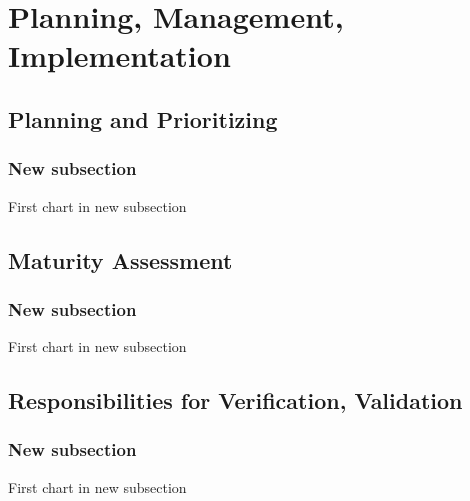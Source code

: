 % 

\section{Planning, Management, Implementation}

\subsection{Planning and Prioritizing}
\begin{frame}\frametitle{New subsection}
	First chart in new subsection
\end{frame}

\subsection{Maturity Assessment}
\begin{frame}\frametitle{New subsection}
	First chart in new subsection
\end{frame}

\subsection{Responsibilities for Verification, Validation}
\begin{frame}\frametitle{New subsection}
	First chart in new subsection
\end{frame}


\endinput  %
